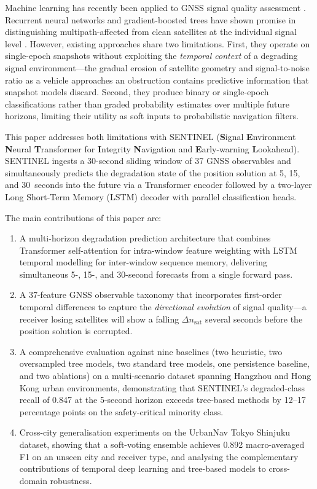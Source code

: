 \documentclass[pdflatex,sn-mathphys-num]{sn-jnl}
\begin{document}
Machine learning has recently been applied to GNSS signal quality assessment
\cite{[AuthorYear_ML_GNSS_review]}.  Recurrent neural networks and
gradient-boosted trees have shown promise in distinguishing multipath-affected
from clean satellites at the individual signal level
\cite{[AuthorYear_RNN_GNSS], [AuthorYear_XGB_GNSS]}.  However, existing
approaches share two limitations.  First, they operate on single-epoch
snapshots without exploiting the \emph{temporal context} of a degrading signal
environment---the gradual erosion of satellite geometry and signal-to-noise
ratio as a vehicle approaches an obstruction contains predictive information
that snapshot models discard.  Second, they produce binary or single-epoch
classifications rather than graded probability estimates over multiple future
horizons, limiting their utility as soft inputs to probabilistic navigation
filters.

This paper addresses both limitations with SENTINEL (\textbf{S}ignal
\textbf{E}nvironment \textbf{N}eural \textbf{T}ransformer for
\textbf{I}ntegrity \textbf{N}avigation and \textbf{E}arly-warning
\textbf{L}ookahead).  SENTINEL ingests a 30-second sliding window of 37
GNSS observables and simultaneously predicts the degradation state of the
position solution at 5, 15, and 30~seconds into the future via a Transformer
encoder followed by a two-layer Long Short-Term Memory (LSTM) decoder with
parallel classification heads.

The main contributions of this paper are:
\begin{enumerate}
  \item A multi-horizon degradation prediction architecture that combines
    Transformer self-attention for intra-window feature weighting with
    LSTM temporal modelling for inter-window sequence memory, delivering
    simultaneous 5-, 15-, and 30-second forecasts from a single forward pass.

  \item A 37-feature GNSS observable taxonomy that incorporates first-order
    temporal differences to capture the \emph{directional evolution} of signal
    quality---a receiver losing satellites will show a falling
    $\Delta n_\text{sat}$ several seconds before the position solution
    is corrupted.

  \item A comprehensive evaluation against nine baselines (two heuristic,
    two oversampled tree models, two standard tree models, one persistence
    baseline, and two ablations) on a multi-scenario dataset spanning Hangzhou
    and Hong Kong urban environments, demonstrating that SENTINEL's
    degraded-class recall of 0.847 at the 5-second horizon exceeds
    tree-based methods by 12--17 percentage points on the safety-critical
    minority class.

  \item Cross-city generalisation experiments on the UrbanNav Tokyo Shinjuku
    dataset, showing that a soft-voting ensemble achieves 0.892 macro-averaged
    F1 on an unseen city and receiver type, and analysing the complementary
    contributions of temporal deep learning and tree-based models to
    cross-domain robustness.
\end{enumerate}
\end{document}
